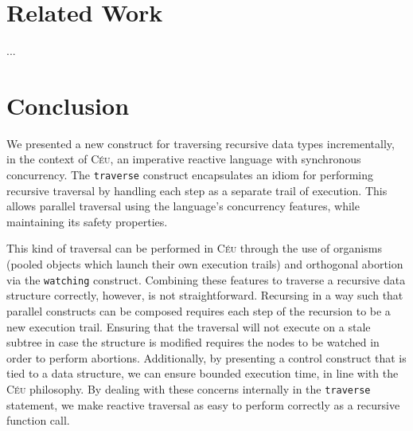 \documentclass{sig-alternate}
\newcommand{\CEU}{\textsc{C\'{e}u}\xspace}
\newcommand{\code}[1] {{\small{\texttt{#1}}}}
\begin{document}
\section{Related Work}

...

\section{Conclusion}

We presented a new construct for traversing recursive data types
incrementally, in the context of \CEU, an imperative reactive language with
synchronous concurrency. The \code{traverse} construct encapsulates an idiom
for performing recursive traversal by handling each step as a separate trail
of execution. This allows parallel traversal using the language's concurrency
features, while maintaining its safety properties.

This kind of traversal can be performed in \CEU through the use of organisms
(pooled objects which launch their own execution trails) and orthogonal
abortion via the \code{watching} construct. Combining these features to
traverse a recursive data structure correctly, however, is not straightforward.
Recursing in a way such that parallel constructs can be composed requires each
step of the recursion to be a new execution trail. Ensuring that the traversal
will not execute on a stale subtree in case the structure is modified requires
the nodes to be watched in order to perform abortions. Additionally, by
presenting a control construct that is tied to a data structure, we can ensure
bounded execution time, in line with the \CEU philosophy. By dealing with these
concerns internally in the \code{traverse} statement, we make reactive
traversal as easy to perform correctly as a recursive function call.

\end{document}
